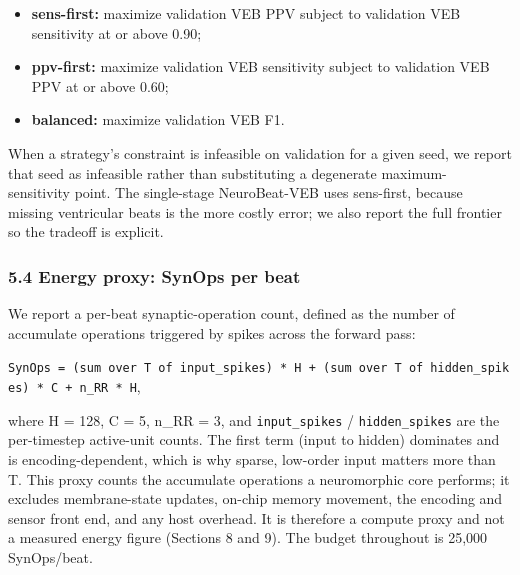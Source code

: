 \documentclass[
]{article}
\providecommand{\tightlist}{%
  \setlength{\itemsep}{0pt}\setlength{\parskip}{0pt}}
\begin{document}
\begin{itemize}
\tightlist
\item
  \textbf{sens-first:} maximize validation VEB PPV subject to validation
  VEB sensitivity at or above 0.90;
\item
  \textbf{ppv-first:} maximize validation VEB sensitivity subject to
  validation VEB PPV at or above 0.60;
\item
  \textbf{balanced:} maximize validation VEB F1.
\end{itemize}

When a strategy's constraint is infeasible on validation for a given
seed, we report that seed as infeasible rather than substituting a
degenerate maximum- sensitivity point. The single-stage NeuroBeat-VEB
uses sens-first, because missing ventricular beats is the more costly
error; we also report the full frontier so the tradeoff is explicit.

\subsubsection{5.4 Energy proxy: SynOps per
beat}\label{energy-proxy-synops-per-beat}

We report a per-beat synaptic-operation count, defined as the number of
accumulate operations triggered by spikes across the forward pass:

\texttt{SynOps\ =\ (sum\ over\ T\ of\ input\_spikes)\ *\ H\ +\ (sum\ over\ T\ of\ hidden\_spikes)\ *\ C\ +\ n\_RR\ *\ H},

where H = 128, C = 5, n\_RR = 3, and \texttt{input\_spikes} /
\texttt{hidden\_spikes} are the per-timestep active-unit counts. The
first term (input to hidden) dominates and is encoding-dependent, which
is why sparse, low-order input matters more than T. This proxy counts
the accumulate operations a neuromorphic core performs; it excludes
membrane-state updates, on-chip memory movement, the encoding and sensor
front end, and any host overhead. It is therefore a compute proxy and
not a measured energy figure (Sections 8 and 9). The budget throughout
is 25,000 SynOps/beat.
\end{document}
